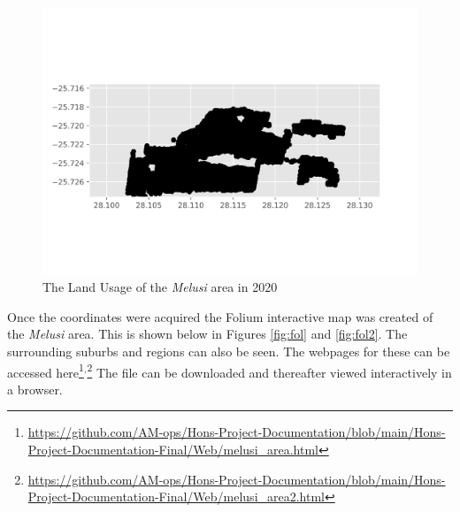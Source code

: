 \begin{figure}[!ht]
\centering
\includegraphics[width=1\textwidth]{Figures/Chapter3/Melusi2020}
\caption{The Land Usage of the \textit{Melusi} area in 2020}
\label{fig:mel2020}
\end{figure}
Once the coordinates were acquired the Folium interactive map was created of the \textit{Melusi} area. This is shown below in Figures \ref{fig:fol} and \ref{fig:fol2}. The surrounding suburbs and regions can also be seen. The webpages for these can be accessed here\footnote{\url{https://github.com/AM-ops/Hons-Project-Documentation/blob/main/Hons-Project-Documentation-Final/Web/melusi_area.html}}$^{,}$\footnote{\url{https://github.com/AM-ops/Hons-Project-Documentation/blob/main/Hons-Project-Documentation-Final/Web/melusi_area2.html}}
The file can be downloaded and thereafter viewed interactively in a browser.

